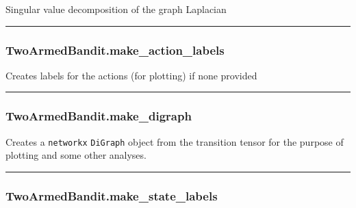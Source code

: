 Singular value decomposition of the graph Laplacian

\begin{center}\rule{0.5\linewidth}{\linethickness}\end{center}

\subsubsection{TwoArmedBandit.make\_action\_labels}\label{twoarmedbandit.make_action_labels}

\begin{Shaded}
\begin{Highlighting}[]
\NormalTok{)}
\end{Highlighting}
\end{Shaded}

Creates labels for the actions (for plotting) if none provided

\begin{center}\rule{0.5\linewidth}{\linethickness}\end{center}

\subsubsection{TwoArmedBandit.make\_digraph}\label{twoarmedbandit.make_digraph}

\begin{Shaded}
\begin{Highlighting}[]
\NormalTok{)}
\end{Highlighting}
\end{Shaded}

Creates a \texttt{networkx} \texttt{DiGraph} object from the transition
tensor for the purpose of plotting and some other analyses.

\begin{center}\rule{0.5\linewidth}{\linethickness}\end{center}

\subsubsection{TwoArmedBandit.make\_state\_labels}\label{twoarmedbandit.make_state_labels}

\begin{Shaded}
\begin{Highlighting}[]
\NormalTok{)}
\end{Highlighting}
\end{Shaded}

